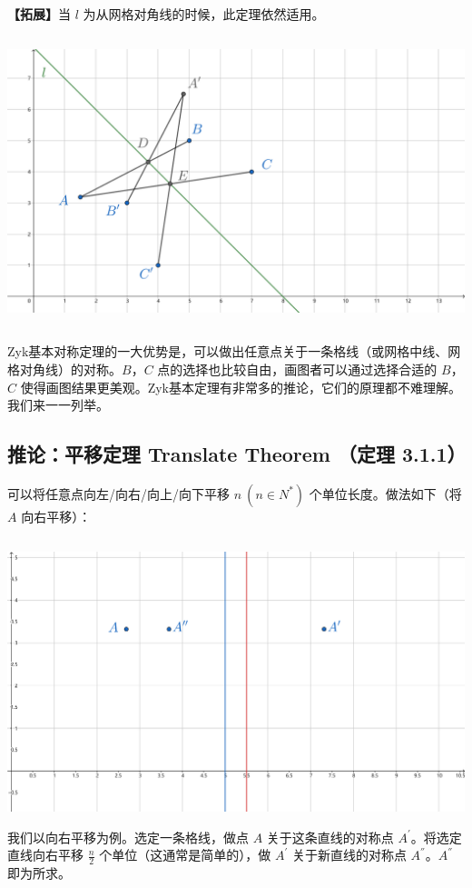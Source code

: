 \documentclass[UTF8]{article}
\begin{document}
\textbf{【拓展】}当 \(l\) 为从网格对角线的时候，此定理依然适用。

\includegraphics[width=5.76806in,height=3.32431in]{media/image4.png}

Zyk基本对称定理的一大优势是，可以做出任意点关于一条格线（或网格中线、网格对角线）的对称。\(B\)，\(C\)
点的选择也比较自由，画图者可以通过选择合适的 \(B\)，\(C\)
使得画图结果更美观。Zyk基本定理有非常多的推论，它们的原理都不难理解。我们来一一列举。

\hypertarget{ux63a8ux8bbaux5e73ux79fbux5b9aux7406-translate-theorem-ux5b9aux7406-3.1.1}{%
\subsection{推论：平移定理 Translate Theorem （定理
3.1.1）}\label{ux63a8ux8bbaux5e73ux79fbux5b9aux7406-translate-theorem-ux5b9aux7406-3.1.1}}

可以将任意点向左/向右/向上/向下平移 \(n\ \left( n \in N^{*} \right)\)
个单位长度。做法如下（将 \(A\) 向右平移）：

\includegraphics[width=5.76806in,height=3.27847in]{media/image5.png}我们以向右平移为例。选定一条格线，做点
\(A\) 关于这条直线的对称点 \(A^{'}\)。将选定直线向右平移 \(\frac{n}{2}\)
个单位（这通常是简单的），做 \(A^{'}\) 关于新直线的对称点
\(A^{''}\)。\(A^{''}\) 即为所求。
\end{document}
